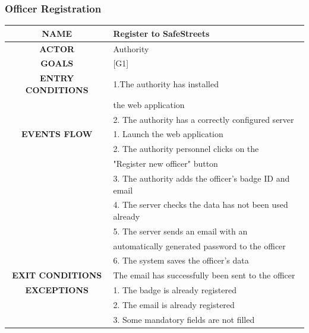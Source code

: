 \documentclass[12pt,a4paper]{article}
\begin{document}
\subsubsection{Officer Registration}
		\begin{center}
			\begin{tabular}{| c | l |}
				\hline
				\textbf{NAME} & Register to SafeStreets \\
				\hline
				\textbf{ACTOR} & Authority \\
				\hline
				\textbf{GOALS} & [G1] \\
				\hline
				\textbf{ENTRY CONDITIONS} &1.The authority has installed \\
				&	the web application \\
				&2. The authority has a correctly configured server \\ \hline
				\textbf{EVENTS FLOW}  &
				1. Launch the web application\\
				&2. The authority personnel clicks on the \\
				& "Register new officer" button \\
				&3. The authority adds the officer's badge ID and email\\
				&4. The server checks the data has not been used already \\
				&5. The server sends an email with an \\
				& automatically generated password to the officer\\
				&6. The system saves the officer's data\\
				\hline
				\textbf{EXIT CONDITIONS}  & The email has successfully been sent to the officer\\ \hline
				\textbf{EXCEPTIONS} &
				1. The badge is already registered\\
				&2. The email is already registered\\
				&3. Some mandatory fields are not filled\\
				\hline
			\end{tabular}
		\end{center}
\end{document}
